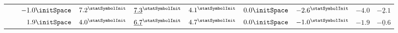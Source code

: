 \begin{tabular}{@{}llrrrrrrrr@{}}
& \diffp{\precFive} & $-1.0\initSpace$ & $7.2^{\statSymbolInit}$ & ${\underline{7.3}}^{\statSymbolInit}$ & $4.1^{\statSymbolInit}$ & $0.0\initSpace$ & $-2.6^{\statSymbolInit}$ & $-4.0$ & $\underline{-2.1}$\\
& \diffp{\ndcg} & $1.9\initSpace$ & $4.0^{\statSymbolInit}$ & ${\underline{6.7}}^{\statSymbolInit}$ & $4.7^{\statSymbolInit}$ & $0.0\initSpace$ & $-1.0^{\statSymbolInit}$ & $-1.9$ & $\underline{-0.6}$\\
\end{tabular}
